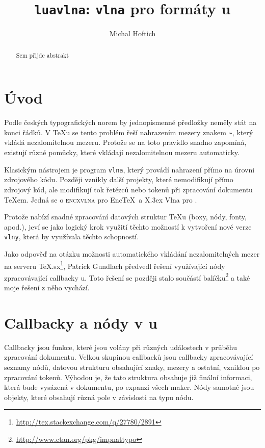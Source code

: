 \documentclass{csbulletin}
\begin{document}
\title{\texttt{luavlna}: \texttt{vlna} pro formáty u}
\author{Michal Hoftich}
\maketitle
\begin{abstract}
Sem přijde abstrakt
\end{abstract}

\section{Úvod}
Podle českých typografických norem by jednopísmenné předložky neměly stát na 
konci řádků. V \TeX u se tento problém řeší nahrazením mezery znakem \verb|~|,
který vkládá nezalomitelnou mezeru. Protože se na toto pravidlo snadno zapomíná,
existují různé pomůcky, které vkládají nezalomitelnou mezeru automaticky.

Klasickým nástrojem je program \verb|vlna|, který provádí nahrazení přímo na
úrovni zdrojového kódu. Později vznikly další projekty, které nemodifikují přímo
zdrojový kód, ale modifikují tok řetězců nebo tokenů při zpracování dokumentu 
\TeX em. Jedná se o \textsc{encxvlna} pro Enc\TeX\ a X\raisebox{\myminus.5ex}{Ǝ}\kern\myminus.3ex Vlna pro .

Protože  nabízí snadné zpracování datových struktur \TeX u 
(boxy, nódy, fonty, apod.), jeví se jako logický krok využití těchto možností
k vytvoření nové verze \verb|vlny|, která by využívala těchto schopností. 

Jako odpověď na otázku možnosti automatického vkládání nezalomitelných mezer 
na serveru TeX.sx\footnote{\url{http://tex.stackexchange.com/q/27780/2891}}, 
Patrick Gundlach předvedl řešení využívající nódy zpracovávající callbacky 
u. Toto řešení se později stalo součástí balíčku\footnote{%
\url{http://www.ctan.org/pkg/impnattypo}} a také moje řešení z něho vychází.

\section{Callbacky a nódy v u}

Callbacky jsou funkce, které jsou volány při různých událostech v průběhu
zpracování dokumentu. Velkou skupinou callbacků jsou callbacky zpracovávající 
seznamy nódů, datovou strukturu obsahující znaky, mezery a ostatní, vzniklou po
zpracování tokenů. Výhodou je, že tato struktura obsahuje již finální informaci,
která bude vysázená v dokumentu, po expanzi všech maker. Nódy samotné jsou 
objekty, které obsahují různá pole v závislosti na typu nódu.
\end{document}

